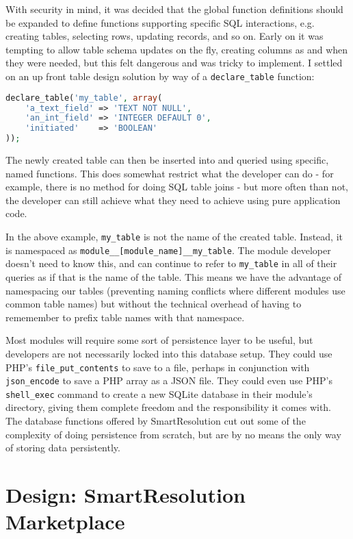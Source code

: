 With security in mind, it was decided that the global function definitions should be expanded to define functions supporting specific SQL interactions, e.g. creating tables, selecting rows, updating records, and so on. Early on it was tempting to allow table schema updates on the fly, creating columns as and when they were needed, but this felt dangerous and was tricky to implement. I settled on an up front table design solution by way of a \lstinline{declare_table} function:

\begin{lstlisting}[language=php]
declare_table('my_table', array(
    'a_text_field' => 'TEXT NOT NULL',
    'an_int_field' => 'INTEGER DEFAULT 0',
    'initiated'    => 'BOOLEAN'
));
\end{lstlisting}

The newly created table can then be inserted into and queried using specific, named functions. This does somewhat restrict what the developer can do - for example, there is no method for doing SQL table joins - but more often than not, the developer can still achieve what they need to achieve using pure application code.

In the above example, \lstinline{my_table} is not the name of the created table. Instead, it is namespaced as \lstinline{module__[module_name]__my_table}. The module developer doesn't need to know this, and can continue to refer to \lstinline{my_table} in all of their queries as if that is the name of the table. This means we have the advantage of namespacing our tables (preventing naming conflicts where different modules use common table names) but without the technical overhead of having to rememember to prefix table names with that namespace.

Most modules will require some sort of persistence layer to be useful, but developers are not necessarily locked into this database setup. They could use PHP's \lstinline{file_put_contents} to save to a file, perhaps in conjunction with \lstinline{json_encode} to save a PHP array as a JSON file. They could even use PHP's \lstinline{shell_exec} command to create a new SQLite database in their module's directory, giving them complete freedom and the responsibility it comes with. The database functions offered by SmartResolution cut out some of the complexity of doing persistence from scratch, but are by no means the only way of storing data persistently.

\section{Design: SmartResolution Marketplace}

